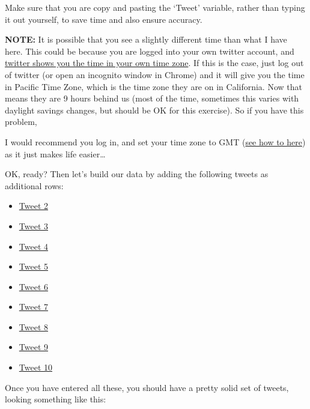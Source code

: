 \documentclass[]{book}
\providecommand{\tightlist}{%
  \setlength{\itemsep}{0pt}\setlength{\parskip}{0pt}}
\theoremstyle{definition}
\theoremstyle{definition}
\theoremstyle{definition}
\theoremstyle{remark}
\begin{document}
Make sure that you are copy and pasting the `Tweet' variable, rather
than typing it out yourself, to save time and also ensure accuracy.

\textbf{NOTE:} It is possible that you see a slightly different time
than what I have here. This could be because you are logged into your
own twitter account, and
\href{http://www.adweek.com/digital/tweet-timestamps/}{twitter shows you
the time in your own time zone}. If this is the case, just log out of
twitter (or open an incognito window in Chrome) and it will give you the
time in Pacific Time Zone, which is the time zone they are on in
California. Now that means they are 9 hours behind us (most of the time,
sometimes this varies with daylight savings changes, but should be OK
for this exercise). So if you have this problem,

I would recommend you log in, and set your time zone to GMT
(\href{https://support.twitter.com/articles/20169405}{see how to here})
as it just makes life easier\ldots{}

OK, ready? Then let's build our data by adding the following tweets as
additional rows:

\begin{itemize}
\tightlist
\item
  \href{https://twitter.com/GMPCityCentre/status/891762454337867776}{Tweet
  2}
\item
  \href{https://twitter.com/GMPCityCentre/status/894515606321590273}{Tweet
  3}
\item
  \href{https://twitter.com/GMPCityCentre/status/894024570109386752}{Tweet
  4}
\item
  \href{https://twitter.com/GMPCityCentre/status/891247668772708352}{Tweet
  5}
\item
  \href{https://twitter.com/GMPCityCentre/status/891254643078176768}{Tweet
  6}
\item
  \href{https://twitter.com/GMPCityCentre/status/890871354924421120}{Tweet
  7}
\item
  \href{https://twitter.com/GMPCityCentre/status/890594946536927233}{Tweet
  8}
\item
  \href{https://twitter.com/GMPCityCentre/status/890161961626996736}{Tweet
  9}
\item
  \href{https://twitter.com/GMPCityCentre/status/889084990495051776}{Tweet
  10}
\end{itemize}

Once you have entered all these, you should have a pretty solid set of
tweets, looking something like this:
\end{document}

